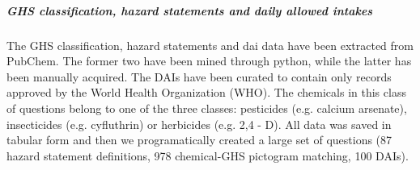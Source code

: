 \subparagraph{GHS classification, hazard statements and daily allowed intakes}

The GHS classification, hazard statements and  \gls{dai} data have been extracted from PubChem. \cite{pubchem}
The former two have been mined through python, while the latter has been manually acquired.
The DAIs have been curated to contain only records approved by the World Health Organization (WHO). 
The chemicals in this class of questions belong to one of the three classes: pesticides (e.g. calcium arsenate), insecticides (e.g. cyfluthrin) or herbicides (e.g. 2,4 - D). 
All data was saved in tabular form and then we programatically created a large set of questions (87 hazard statement definitions, 978 chemical-GHS pictogram matching, 100 DAIs).
